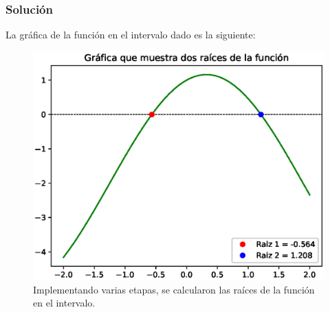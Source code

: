 \begin{frame}
\frametitle{Solución}
La gráfica de la función en el intervalo dado es la siguiente:
\begin{figure}
	\centering
	\includegraphics[scale=0.4]{Imagenes/Ejercicio_NR_Seno_02.eps}
	\caption{Implementando varias etapas, se calcularon las raíces de la función en el  intervalo.}
\end{figure}
\end{frame}

